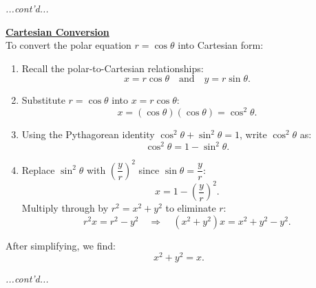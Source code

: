 \documentclass{article}
\begin{document}
\begin{exercisebox}
    \begin{solutionbox}
        \textit{...cont'd...}
        \begin{conceptbox}
        \textbf{\underline{Cartesian Conversion}} \\

        To convert the polar equation \( r = \cos\theta \) into Cartesian form:
        \begin{enumerate}
            \item Recall the polar-to-Cartesian relationships:
            \[
            x = r \cos\theta \quad \text{and} \quad y = r \sin\theta.
            \]
            \item Substitute \( r = \cos\theta \) into \( x = r \cos\theta \):
            \[
            x = (\cos\theta)(\cos\theta) = \cos^2\theta.
            \]
            \item Using the Pythagorean identity \( \cos^2\theta + \sin^2\theta = 1 \), write \( \cos^2\theta \) as:
            \[
            \cos^2\theta = 1 - \sin^2\theta.
            \]
            \item Replace \( \sin^2\theta \) with \( \left(\dfrac{y}{r}\right)^2 \) since \( \sin\theta = \dfrac{y}{r} \):
            \[
            x = 1 - \left(\frac{y}{r}\right)^2.
            \]
            Multiply through by \( r^2 = x^2 + y^2 \) to eliminate \( r \):
            \[
            r^2x = r^2 - y^2 \quad \Rightarrow \quad (x^2 + y^2)x = x^2 + y^2 - y^2.
            \]
        \end{enumerate}

        After simplifying, we find:
        \[
        x^2 + y^2 = x.
        \]
        
        \textit{...cont'd...}
        \end{conceptbox}
    \end{solutionbox}
\end{exercisebox}
\end{document}
